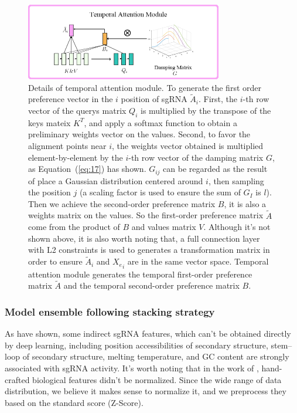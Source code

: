 \documentclass{bioinfo}
\begin{document}
\begin{figure}[!tpb]
\centerline{\includegraphics[width=86mm]{temporalattentionmodule.png}}
\caption{        
    Details of temporal attention module. 
    To generate the first order preference vector in the $i$ position of sgRNA $\tilde{A}_i$. 
    First, the $i$-th row vector of the querys matrix $Q_i$ is multiplied by the transpose of the keys mateix $K^T$, and apply a softmax function to obtain a preliminary weights vector on the values. 
    Second, to favor the alignment points near $i$, the weights vector obtained is multiplied element-by-element by the $i$-th row vector of the damping matrix $G$, as Equation~(\ref{eq:17}) has shown. 
    $G_{ij}$ can be regarded as the result of place a Gaussian distribution centered around $i$, then sampling the position $j$ (a scaling factor is used to ensure the sum of $G_I$ is $l$). 
    Then we achieve the second-order preference matrix $B$, it is also a weights matrix on the values. So the first-order preference matrix $\tilde{A}$ come from the product of $B$ and values matrix $V$.
    Although it's not shown above, it is also worth noting that, a full connection layer with L2 constraints is used to generates a transformation matrix in order to ensure $\tilde{A}_i$ and ${X_e} _i$ are in the same vector space. 
    Temporal attention module generates the temporal first-order preference matrix $\tilde{A}$ and the temporal second-order preference matrix $B$.
    }\label{fig:05}
\end{figure}

\subsubsection{Model ensemble following stacking strategy}

As \citeauthor{wang2019optimized,Wang2016ProteinSS} have shown, some indirect sgRNA features, which can't be obtained directly by deep learning, including position accessibilities of secondary structure, stem–loop of secondary structure, melting temperature, and GC content are strongly associated with sgRNA activity. 
It's worth noting that in the work of \citeauthor{wang2019optimized}, hand-crafted biological features didn't be normalized. 
Since the wide range of data distribution, we believe it makes sense to normalize it, and we preprocess they based on the standard score (Z-Score).
\end{document}
